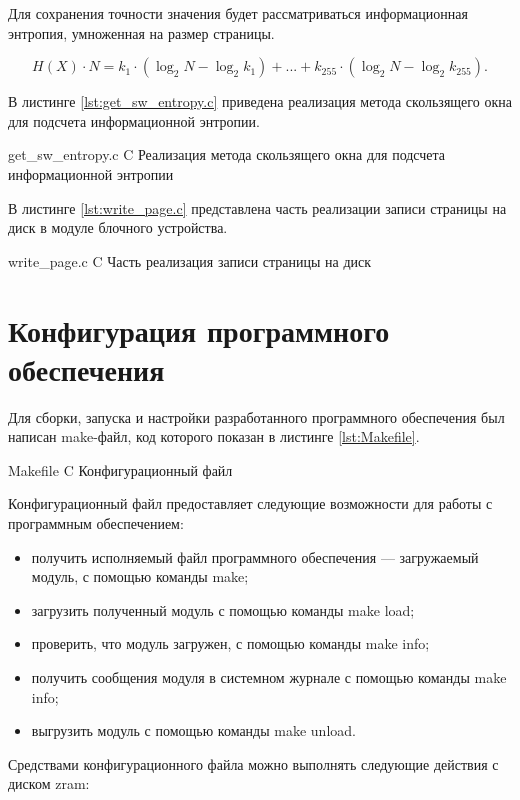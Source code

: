 Для сохранения точности значения будет рассматриваться информационная энтропия, умноженная на размер страницы.

\begin{equation}
    H(X) \cdot N = k_1 \cdot ( \log_{2}N - \log_{2}k_1) + ... + k_{255} \cdot (\log_{2}N - \log_{2}k_{255}).
\end{equation}

В листинге \ref{lst:get_sw_entropy.c} приведена реализация метода скользящего окна для подсчета информационной энтропии. 

    {get_sw_entropy.c}
    {C}
    {Реализация метода скользящего окна для подсчета информационной энтропии}

В листинге \ref{lst:write_page.c} представлена часть реализации записи страницы на диск в модуле блочного устройства.

    {write_page.c}
    {C}
    {Часть реализация записи страницы на диск}

\section{Конфигурация программного обеспечения}

Для сборки, запуска и настройки разработанного программного обеспечения был написан make-файл, код которого показан в листинге \ref{lst:Makefile}.

    {Makefile}
    {C}
    {Конфигурационный файл}

Конфигурационный файл предоставляет следующие возможности для работы с программным обеспечением:

\begin{itemize}
    \item получить исполняемый файл программного обеспечения --- загружаемый модуль, с помощью команды make;
    \item загрузить полученный модуль с помощью команды make load;
    \item проверить, что модуль загружен, с помощью команды make info;
    \item получить сообщения модуля в системном журнале с помощью команды make info;
    \item выгрузить модуль с помощью команды make unload.
\end{itemize}

Средствами конфигурационного файла можно выполнять следующие действия с диском zram:

